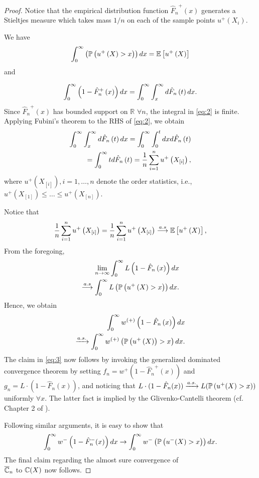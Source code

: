 \begin{proof}
Notice that the empirical distribution function 
${\hat F_n}^+\left(x\right)$ 
generates a Stieltjes measure which takes mass 
$1/n$ on each of the sample points $u^+\left(X_{i}\right)$. 

We have
$$\int_0^{\infty} \left(\mathbb{P}\left( u^+\left(X\right)>x \right)\right)  dx = \mathbb{E}\left[u^+\left(X\right)\right]$$
and

\begin{equation}
\int_0^{\infty} \left(1-{\hat F_n}^+\left(x\right)\right)  dx =\int_0^{\infty} \int_x^\infty d \hat{F}_n\left(t\right) dx.\label{eq:2}
\end{equation}
Since ${\hat F_n}^+\left(x\right)$ has bounded support on $\mathbb{R}$ $\forall n$, the integral in \eqref{eq:2} is finite.
Applying Fubini's theorem to the RHS of \eqref{eq:2}, we obtain
\begin{align*}
\int_0^{\infty} \int_x^\infty d \hat{F}_n\left(t\right) dx = \int_0^{\infty} \int_0^t dx d \hat{F}_n\left(t\right) \\
= \int_0^{\infty} t d\hat{F}_n\left(t\right) = \frac{1}{n} \sum_{i=1}^n u^+\left(X_{[i]}\right),
 \end{align*}
 where $u^+\left(X_{[i]}\right), i=1,\ldots,n$ denote the order statistics, i.e., $u^+\left(X_{[1]}\right) \le \ldots \le u^+\left(X_{[n]}\right)$.
 
Notice that 
\begin{align*}
\frac{1}{n}
\sum_{i=1}^n u^+\left(X_{[i]}\right)
=
\frac{1}{n}
\sum_{i=1}^n u^+\left(X_{[i]}\right)
\overset{a.s}\longrightarrow 
\mathbb{E}\left[u^+\left(X\right)\right],
\end{align*}
From the foregoing,
\begin{align*}
\lim_{n\rightarrow \infty} \int_0^{\infty} L\left(1-\hat{F}_n\left(x\right)\right) dx\\
\overset{a.s} \longrightarrow
\int_0^{\infty} L \left(\mathbb{P}\left( u^+\left(X\right)>x \right)\right) dx.
\end{align*}
Hence, we obtain
\begin{align*}
\int_0^\infty w^{\left(+\right)}\left(1-\hat{F}_n\left(x\right)\right) dx\\
 \xrightarrow{a.s.} 
\int_0^\infty w^{\left(+\right)}\left(\mathbb{P}\left( u^+\left(X\right)\right)>x \right) dx.
\end{align*}
The claim in \eqref{eq:3} now follows by invoking the generalized dominated convergence theorem by setting $f_n = w^+(1-{\hat F_n}^+(x))$ and $g_n = L\cdot(1-\hat{F}_n(x))$, and noticing that $L\cdot(1-\hat{F}_n(x)) \xrightarrow{a.s.} L(\mathbb{P}\left( u^+(X)>x \right))$ uniformly $\forall x$. The latter fact is implied by the Glivenko-Cantelli theorem (cf. Chapter 2 of \cite{wasserman2006}).

Following similar arguments, it is easy to show that 
$$
\int_0^{\infty} w^-\left(1-{\hat F_n}^-(x)\right)  dx \rightarrow \int_0^{\infty} w^-\left(\mathbb{P}\left( u^-(X)>x \right)\right) dx.
$$
The final claim regarding the almost sure convergence of \\$\overline {\mathbb{C}}_n$ to $\mathbb{C}(X)$ now follows.
\end{proof}

